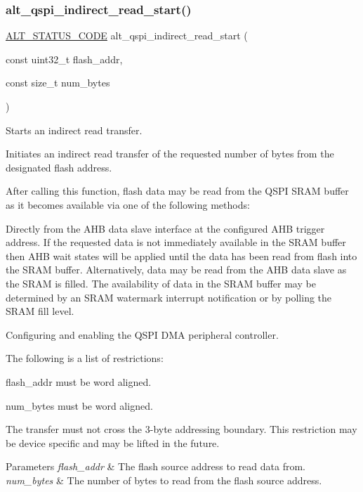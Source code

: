 \subsubsection{\texorpdfstring{alt\_qspi\_indirect\_read\_start()}{alt\_qspi\_indirect\_read\_start()}}
{\footnotesize\ttfamily \mbox{\hyperlink{hwlib_8h_abdb0d369f069723ca55d6c94bcaaaa12}{A\+L\+T\+\_\+\+S\+T\+A\+T\+U\+S\+\_\+\+C\+O\+DE}} alt\+\_\+qspi\+\_\+indirect\+\_\+read\+\_\+start (\begin{DoxyParamCaption}\item[{const uint32\+\_\+t}]{flash\+\_\+addr,  }\item[{const size\+\_\+t}]{num\+\_\+bytes }\end{DoxyParamCaption})}

Starts an indirect read transfer.

Initiates an indirect read transfer of the requested number of bytes from the designated flash address.

After calling this function, flash data may be read from the Q\+S\+PI S\+R\+AM buffer as it becomes available via one of the following methods\+:
\begin{DoxyItemize}
\item Directly from the A\+HB data slave interface at the configured A\+HB trigger address. If the requested data is not immediately available in the S\+R\+AM buffer then A\+HB wait states will be applied until the data has been read from flash into the S\+R\+AM buffer. Alternatively, data may be read from the A\+HB data slave as the S\+R\+AM is filled. The availability of data in the S\+R\+AM buffer may be determined by an S\+R\+AM watermark interrupt notification or by polling the S\+R\+AM fill level.
\item Configuring and enabling the Q\+S\+PI D\+MA peripheral controller.
\end{DoxyItemize}

The following is a list of restrictions\+:
\begin{DoxyItemize}
\item flash\+\_\+addr must be word aligned.
\item num\+\_\+bytes must be word aligned.
\item The transfer must not cross the 3-\/byte addressing boundary. This restriction may be device specific and may be lifted in the future.
\end{DoxyItemize}


\begin{DoxyParams}{Parameters}
{\em flash\+\_\+addr} & The flash source address to read data from.\\
\hline
{\em num\+\_\+bytes} & The number of bytes to read from the flash source address.\\
\hline
\end{DoxyParams}

